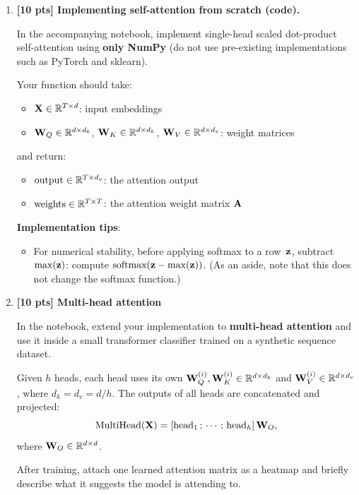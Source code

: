 \documentclass[submit]{../harvardml}
\begin{document}
\begin{problem}
\begin{enumerate}
\begin{enumerate}
  \item The standard fix is to add a \textbf{positional encoding}
  $\boldP\boldE \in \reals^{T \times d}$ to the input:
  $\boldX' = \boldX + \boldP\boldE$.
  Why does this break permutation equivariance?
\end{enumerate}

\item \textbf{[10 pts] Implementing self-attention from scratch (code).}

In the accompanying notebook, implement single-head scaled dot-product self-attention
using \textbf{only NumPy} (do not use pre-existing implementations such as PyTorch and sklearn).

Your function should take:
\begin{itemize}
  \item $\mathbf{X} \in \mathbb{R}^{T \times d}$: input embeddings
  \item $\mathbf{W}_Q \in \mathbb{R}^{d \times d_k}$, $\mathbf{W}_K \in \mathbb{R}^{d \times d_k}$,
        $\mathbf{W}_V \in \mathbb{R}^{d \times d_v}$: weight matrices
\end{itemize}
and return:
\begin{itemize}
  \item $\text{output} \in \mathbb{R}^{T \times d_v}$: the attention output
  \item $\text{weights} \in \mathbb{R}^{T \times T}$: the attention weight matrix $\mathbf{A}$
\end{itemize}

\textbf{Implementation tips}:
\begin{itemize}
  \item For numerical stability, before applying softmax to a row~$\mathbf{z}$, subtract
  $\max(\mathbf{z})$: compute $\text{softmax}(\mathbf{z} - \max(\mathbf{z}))$. (As an aside, note that this does not change the softmax function.)
\end{itemize}

\item \textbf{[10 pts] Multi-head attention}

In the notebook, extend your implementation to \textbf{multi-head attention}
and use it inside a small transformer classifier trained on a synthetic
sequence dataset.

Given $h$ heads, each head
  uses its own $\mathbf{W}_Q^{(i)}, \mathbf{W}_K^{(i)} \in \mathbb{R}^{d \times d_k}$ and
  $\mathbf{W}_V^{(i)} \in \mathbb{R}^{d \times d_v}$, where $d_k = d_v = d / h$.
  The outputs of all heads are concatenated and projected:
  \[
    \text{MultiHead}(\mathbf{X}) = [\text{head}_1 \,;\, \cdots \,;\, \text{head}_h]\,
    \mathbf{W}_O,
  \]
  where $\mathbf{W}_O \in \mathbb{R}^{d \times d}$.

After training, attach one learned attention matrix as a heatmap and
briefly describe what it suggests the model is attending to.


\end{enumerate}

\end{problem}
\end{document}
